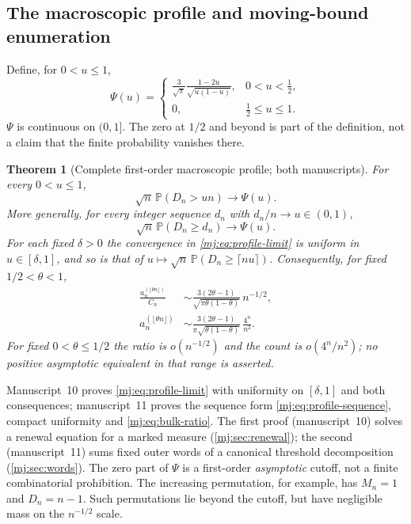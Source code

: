 \documentclass[11pt,a4paper]{article}
\newtheorem{theorem}{Theorem}[section]
\theoremstyle{definition}\newaliascnt{definition}{theorem}
\theoremstyle{remark}\newaliascnt{remark}{theorem}
\newcommand{\ljP}{\mathbb P}
\begin{document}
\subsection{The macroscopic profile and moving-bound enumeration}
Define, for $0<u\le1$,
\begin{equation}
 \Psi(u)=
 \begin{cases}
 \displaystyle\frac3{\sqrt\pi}\frac{1-2u}{\sqrt{u(1-u)}},&0<u<\tfrac12,\\[6pt]
 0,&\tfrac12\le u\le1.
 \end{cases}
 \label{mj:eq:Psi}
\end{equation}
$\Psi$ is continuous on $(0,1]$. The zero at $1/2$ and beyond is part of the
definition, not a claim that the finite probability vanishes there.

\begin{theorem}[Complete first-order macroscopic profile; both manuscripts]
\label{mj:thm:profile}
For every $0<u\le1$,
\begin{equation}
 \sqrt n\,\ljP(D_n>un)\longrightarrow\Psi(u).
 \label{mj:eq:profile-limit}
\end{equation}
More generally, for every integer sequence $d_n$ with $d_n/n\to
u\in(0,1)$,
\begin{equation}
 \sqrt n\,\ljP(D_n\ge d_n)\longrightarrow\Psi(u).
 \label{mj:eq:profile-sequence}
\end{equation}
For each fixed $\delta>0$ the convergence in \eqref{mj:eq:profile-limit}
is uniform in $u\in[\delta,1]$, and so is that of
$u\mapsto\sqrt n\,\ljP(D_n\ge\lceil nu\rceil)$. Consequently, for fixed
$1/2<\theta<1$,
\begin{align}
 \frac{a_n^{(\lfloor\theta n\rfloor)}}{C_n}
 &\sim\frac{3(2\theta-1)}{\sqrt{\pi\theta(1-\theta)}}\,n^{-1/2},
 \label{mj:eq:bulk-ratio}\\
 a_n^{(\lfloor\theta n\rfloor)}
 &\sim\frac{3(2\theta-1)}{\pi\sqrt{\theta(1-\theta)}}\,
       \frac{4^n}{n^2}.
 \label{mj:eq:bulk-count}
\end{align}
For fixed $0<\theta\le1/2$ the ratio is $o(n^{-1/2})$ and the count is
$o(4^n/n^2)$; no positive asymptotic equivalent in that range is asserted.
\end{theorem}

Manuscript~10 proves \eqref{mj:eq:profile-limit} with uniformity on
$[\delta,1]$ and both consequences; manuscript~11 proves the sequence form
\eqref{mj:eq:profile-sequence}, compact uniformity and \eqref{mj:eq:bulk-ratio}.
The first proof (manuscript~10) solves a renewal equation for a marked
measure (\cref{mj:sec:renewal}); the second (manuscript~11) sums fixed outer
words of a canonical threshold decomposition (\cref{mj:sec:words}). The
zero part of $\Psi$ is a first-order \emph{asymptotic} cutoff, not a finite
combinatorial prohibition. The increasing permutation, for example, has
$M_n=1$ and $D_n=n-1$. Such permutations lie beyond the cutoff, but have
negligible mass on the $n^{-1/2}$ scale.
\end{document}
